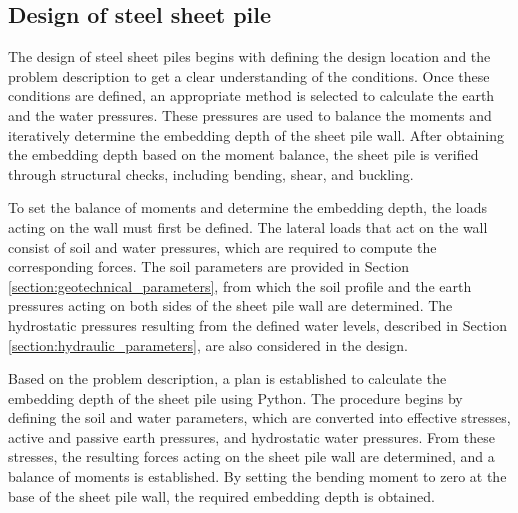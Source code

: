 



\newpage

\subsection{Design of steel sheet pile}
\label{section:design_sheet_pile}

The design of steel sheet piles begins with defining the design location and the problem description to get a clear understanding of the conditions. Once these conditions are defined, an appropriate method is selected to calculate the earth and the water pressures. These pressures are used to balance the moments and iteratively determine the embedding depth of the sheet pile wall. After obtaining the embedding depth based on the moment balance, the sheet pile is verified through structural checks, including bending, shear, and buckling.

To set the balance of moments and determine the embedding depth, the loads acting on the wall must first be defined. The lateral loads that act on the wall consist of soil and water pressures, which are required to compute the corresponding forces. The soil parameters are provided in Section \ref{section:geotechnical_parameters}, from which the soil profile and the earth pressures acting on both sides of the sheet pile wall are determined. The hydrostatic pressures resulting from the defined water levels, described in Section \ref{section:hydraulic_parameters}, are also considered in the design. 

Based on the problem description, a plan is established to calculate the embedding depth of the sheet pile using Python. The procedure begins by defining the soil and water parameters, which are converted into effective stresses, active and passive earth pressures, and hydrostatic water pressures. From these stresses, the resulting forces acting on the sheet pile wall are determined, and a balance of moments is established. By setting the bending moment to zero at the base of the sheet pile wall, the required embedding depth is obtained.

